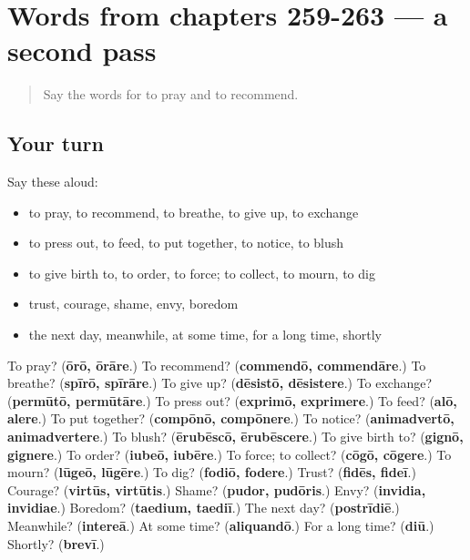 \section[(dialogue)]{Words from chapters 259-263 — a second pass}

\label{lesson:LA-R263-second-pass-words-from-chapters-259-263}



\begin{quote}
Say the words for to pray and to recommend.
\end{quote}

\subsection*{Your turn}
Say these aloud:

\begin{itemize}
\raggedright
  \item to pray, to recommend, to breathe, to give up, to exchange
  \item to press out, to feed, to put together, to notice, to blush
  \item to give birth to, to order, to force; to collect, to mourn, to dig
  \item trust, courage, shame, envy, boredom
  \item the next day, meanwhile, at some time, for a long time, shortly
\end{itemize}

\begin{tcolorbox}[breakable,colback=teal!4,colframe=teal!35!black,title={Before you move on}]
To pray? (\textbf{ōrō, ōrāre}.) To recommend? (\textbf{commendō, commendāre}.) To breathe? (\textbf{spīrō, spīrāre}.) To give up? (\textbf{dēsistō, dēsistere}.) To exchange? (\textbf{permūtō, permūtāre}.) To press out? (\textbf{exprimō, exprimere}.) To feed? (\textbf{alō, alere}.) To put together? (\textbf{compōnō, compōnere}.) To notice? (\textbf{animadvertō, animadvertere}.) To blush? (\textbf{ērubēscō, ērubēscere}.) To give birth to? (\textbf{gignō, gignere}.) To order? (\textbf{iubeō, iubēre}.) To force; to collect? (\textbf{cōgō, cōgere}.) To mourn? (\textbf{lūgeō, lūgēre}.) To dig? (\textbf{fodiō, fodere}.) Trust? (\textbf{fidēs, fideī}.) Courage? (\textbf{virtūs, virtūtis}.) Shame? (\textbf{pudor, pudōris}.) Envy? (\textbf{invidia, invidiae}.) Boredom? (\textbf{taedium, taediī}.) The next day? (\textbf{postrīdiē}.) Meanwhile? (\textbf{intereā}.) At some time? (\textbf{aliquandō}.) For a long time? (\textbf{diū}.) Shortly? (\textbf{brevī}.)
\end{tcolorbox}
